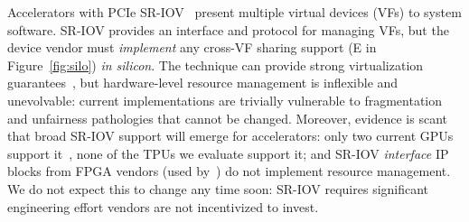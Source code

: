 Accelerators with PCIe SR-IOV~\cite{sriov} present multiple virtual devices (VFs) to system software.
SR-IOV provides an interface and protocol for managing VFs, but the device vendor must \emph{implement} any cross-VF sharing support (E in Figure~\ref{fig:silo}) \emph{in silicon}.
The technique can provide strong virtualization guarantees~\cite{dong2012high,dong2008sr}, but hardware-level resource management
is inflexible and unevolvable: current implementations are trivially vulnerable to fragmentation and unfairness pathologies that cannot be changed.
Moreover, evidence is scant that broad SR-IOV support will emerge for accelerators:
only two current GPUs support it~\cite{amdfirepro,nvidiagrid}, none of the TPUs we evaluate support it;
and SR-IOV \emph{interface} IP blocks from FPGA vendors (used by~\cite{vu2014enabling,zazo2015pcie,vfpgamanager,huang2009fpgavirt}) do not implement resource management.
We do not expect this to change any time soon:
SR-IOV requires significant engineering effort vendors are not incentivized to invest.

